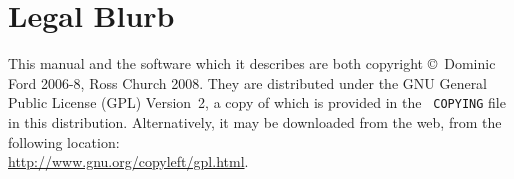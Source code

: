 \section{Legal Blurb}

This manual and the software which it describes are both copyright \copyright\
Dominic Ford 2006-8, Ross Church 2008. They are distributed under the GNU
General Public License (GPL) Version~2, a copy of which is provided in the {\tt
COPYING} file in this distribution. Alternatively, it may be downloaded from the web, from
the following location:\\ \url{http://www.gnu.org/copyleft/gpl.html}.

